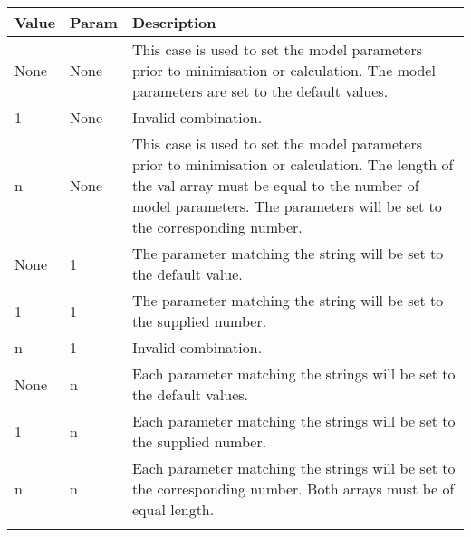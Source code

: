 \documentclass[a4paper,11pt,twoside,openright]{book}
\def\lthtmlcheckvsize{\ifdim\ht\sizebox<\vsize 
  \ifdim\wd\sizebox<\hsize\expandafter\hfill\fi \expandafter\vfill
  \else\expandafter\vss\fi}%
\begin{document}
{\newpage\clearpage
{}%
\begin{table*}\begin{scriptsize}
\begin{center}

\begin{tabularx}{\textwidth}{llX}
\\[-5pt]
\toprule
Value & Param & Description \\
\midrule
None & None & This case is used to set the model parameters prior to minimisation or calculation.  The model parameters are set to the default values. \\
1 & None & Invalid combination. \\
n & None & This case is used to set the model parameters prior to minimisation or calculation.  The length of the val array must be equal to the number of model parameters.  The parameters will be set to the corresponding number. \\
None & 1 & The parameter matching the string will be set to the default value. \\
1 & 1 & The parameter matching the string will be set to the supplied number. \\
n & 1 & Invalid combination. \\
None & n & Each parameter matching the strings will be set to the default values. \\
1 & n & Each parameter matching the strings will be set to the supplied number. \\
n & n & Each parameter matching the strings will be set to the corresponding number.  Both arrays must be of equal length. \\
\bottomrule
\\[-5pt]
\end{tabularx}
\end{center}
\end{scriptsize}
\end{table*}%
\lthtmlfigureZ
\lthtmlcheckvsize\clearpage}

\addtocounter{enumi}{-1}
\end{document}
